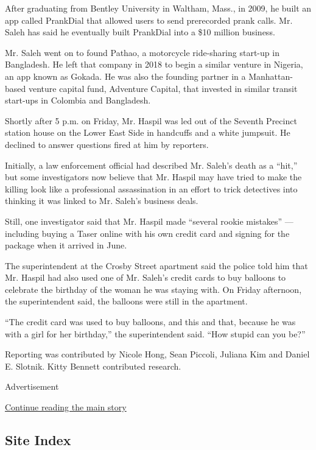 After graduating from Bentley University in Waltham, Mass., in 2009, he
built an app called PrankDial that allowed users to send prerecorded
prank calls. Mr. Saleh has said he eventually built PrankDial into a
\$10 million business.

Mr. Saleh went on to found Pathao, a motorcycle ride-sharing start-up in
Bangladesh. He left that company in 2018 to begin a similar venture in
Nigeria, an app known as Gokada. He was also the founding partner in a
Manhattan-based venture capital fund, Adventure Capital, that invested
in similar transit start-ups in Colombia and Bangladesh.

Shortly after 5 p.m. on Friday, Mr. Haspil was led out of the Seventh
Precinct station house on the Lower East Side in handcuffs and a white
jumpsuit. He declined to answer questions fired at him by reporters.

Initially, a law enforcement official had described Mr. Saleh's death as
a ``hit,'' but some investigators now believe that Mr. Haspil may have
tried to make the killing look like a professional assassination in an
effort to trick detectives into thinking it was linked to Mr. Saleh's
business deals.

Still, one investigator said that Mr. Haspil made ``several rookie
mistakes'' --- including buying a Taser online with his own credit card
and signing for the package when it arrived in June.

The superintendent at the Crosby Street apartment said the police told
him that Mr. Haspil had also used one of Mr. Saleh's credit cards to buy
balloons to celebrate the birthday of the woman he was staying with. On
Friday afternoon, the superintendent said, the balloons were still in
the apartment.

``The credit card was used to buy balloons, and this and that, because
he was with a girl for her birthday,'' the superintendent said. ``How
stupid can you be?''

Reporting was contributed by Nicole Hong, Sean Piccoli, Juliana Kim and
Daniel E. Slotnik. Kitty Bennett contributed research.

Advertisement

\protect\hyperlink{after-bottom}{Continue reading the main story}

\hypertarget{site-index}{%
\subsection{Site Index}\label{site-index}}

